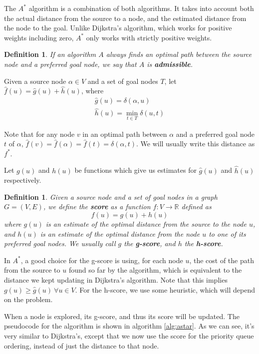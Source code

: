 \documentclass[12pt]{report}
\newtheorem{definition}[theorem]{Definition}
\begin{document}
The $A^*$ algorithm is a combination of both algorithms. It takes into account both the actual distance from the source to a node, and the estimated distance from the node to the goal. Unlike Dijkstra's algorithm, which works for positive weights including zero, $A^*$ only works with strictly positive weights.

\begin{definition}
If an algorithm $A$ always finds an optimal path between the source node and a preferred goal node, we say that $A$ is \textbf{admissible}.
\end{definition}

Given a source node $\alpha \in V$ and a set of goal nodes $T$, let $\hat{f}(u) = \hat{g}(u) + \hat{h}(u)$, where 
\begin{align*}
\hat{g}(u) = \delta(\alpha, u)\\
\hat{h}(u) = \min_{t \in T} \delta(u, t)
\end{align*}
 
Note that for any node $v$ in an optimal path between $\alpha$ and a preferred goal node $t$ of $\alpha$, $\hat{f}(v) = \hat{f}(\alpha) = \hat{f}(t) = \delta(\alpha, t)$. We will usually write this distance as $f^*$.

Let $g(u)$ and $h(u)$ be functions which give us estimates for $\hat{g}(u)$ and $\hat{h}(u)$ respectively.

\begin{definition}
Given a source node and a set of goal nodes in a graph $G = (V, E)$, we define the \textbf{score} as a function $f \colon V \to \mathbb{R}$ defined as
\begin{equation}
	f(u) = g(u) + h(u)
\end{equation}
where $g(u)$ is an estimate of the optimal distance from the source to the node $u$, and $h(u)$ is an estimate of the optimal distance from the node $u$ to one of its preferred goal nodes. We usually call $g$ the \textbf{g-score}, and $h$ the \textbf{h-score}.
\end{definition}

In $A^*$, a good choice for the g-score is using, for each node $u$, the cost of the path from the source to $u$ found so far by the algorithm, which is equivalent to the distance we kept updating in Dijkstra's algorithm. Note that this implies $g(u) \geq \hat{g}(u) \ \forall u \in V$. For the h-score, we use some heuristic, which will depend on the problem.

When a node is explored, its g-score, and thus its score will be updated. The pseudocode for the algorithm is shown in algorithm \ref{alg:astar}. As we can see, it's very similar to Dijkstra's, except that we now use the score for the priority queue ordering, instead of just the distance to that node.
\end{document}
